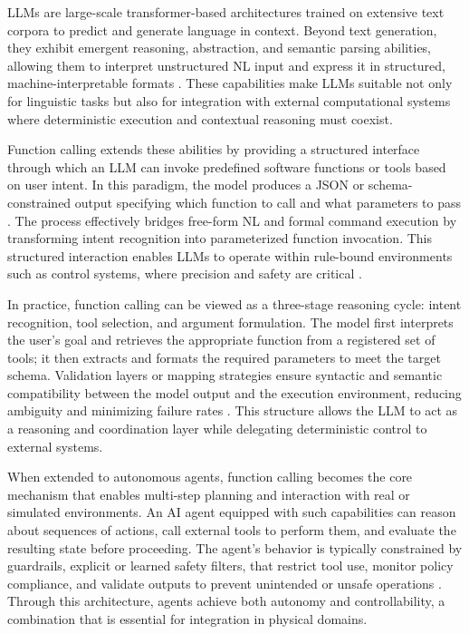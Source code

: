 
LLMs are large-scale transformer-based architectures trained on extensive text corpora to predict and generate language in context. Beyond text generation, they exhibit emergent reasoning, abstraction, and semantic parsing abilities, allowing them to interpret unstructured NL input and express it in structured, machine-interpretable formats \cite{10.1145/3744746}. These capabilities make LLMs suitable not only for linguistic tasks but also for integration with external computational systems where deterministic execution and contextual reasoning must coexist.

Function calling extends these abilities by providing a structured interface through which an LLM can invoke predefined software functions or tools based on user intent. In this paradigm, the model produces a JSON or schema-constrained output specifying which function to call and what parameters to pass \cite{wang2025function}. The process effectively bridges free-form NL and formal command execution by transforming intent recognition into parameterized function invocation. This structured interaction enables LLMs to operate within rule-bound environments such as control systems, where precision and safety are critical \cite{10.1145/3744746}.

In practice, function calling can be viewed as a three-stage reasoning cycle: intent recognition, tool selection, and argument formulation. The model first interprets the user’s goal and retrieves the appropriate function from a registered set of tools; it then extracts and formats the required parameters to meet the target schema. Validation layers or mapping strategies ensure syntactic and semantic compatibility between the model output and the execution environment, reducing ambiguity and minimizing failure rates \cite{wang2025function}. This structure allows the LLM to act as a reasoning and coordination layer while delegating deterministic control to external systems.

When extended to autonomous agents, function calling becomes the core mechanism that enables multi-step planning and interaction with real or simulated environments. An AI agent equipped with such capabilities can reason about sequences of actions, call external tools to perform them, and evaluate the resulting state before proceeding. The agent’s behavior is typically constrained by guardrails, explicit or learned safety filters, that restrict tool use, monitor policy compliance, and validate outputs to prevent unintended or unsafe operations \cite{openai2023practicalagents}. Through this architecture, agents achieve both autonomy and controllability, a combination that is essential for integration in physical domains.

